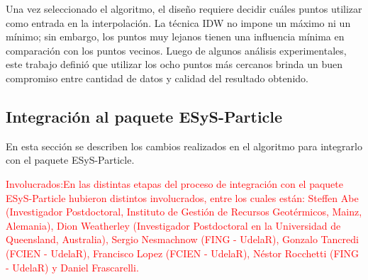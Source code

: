 \documentclass[a4paper,11pt]{book}
\begin{document}
Una vez seleccionado el algoritmo, el diseño requiere decidir cuáles puntos utilizar como entrada en la interpolación. La técnica IDW no impone un máximo ni un mínimo; sin embargo, los puntos muy lejanos tienen una influencia mínima en comparación con los puntos vecinos. Luego de algunos análisis experimentales, este trabajo definió que utilizar los ocho puntos más cercanos brinda un buen compromiso entre cantidad de datos y calidad del resultado obtenido.

\subsection{Integración al paquete ESyS-Particle}

En esta sección se describen los cambios realizados en el algoritmo para integrarlo con el paquete ESyS-Particle.

\textcolor{red}{Involucrados:En las distintas etapas del proceso de integración con el paquete ESyS-Particle hubieron distintos involucrados, entre los cuales están: Steffen Abe (Investigador Postdoctoral, Instituto de Gestión de Recursos Geotérmicos, Mainz, Alemania), Dion Weatherley (Investigador Postdoctoral en la Universidad de Queensland, Australia), Sergio Nesmachnow (FING - UdelaR), Gonzalo Tancredi (FCIEN - UdelaR), Francisco Lopez (FCIEN - UdelaR), Néstor Rocchetti (FING - UdelaR) y Daniel Frascarelli.}


\end{document}

